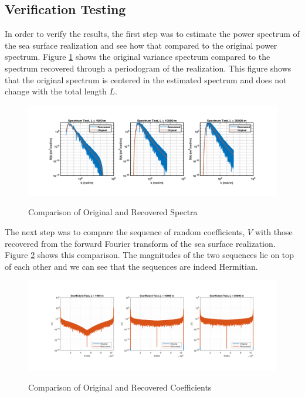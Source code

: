 \subsection{Verification Testing}
In order to verify the results, the first step was to estimate the power spectrum of the sea surface realization and see how that compared to the original power spectrum. Figure \ref{os_fig:9} shows the original variance spectrum compared to the spectrum recovered through a periodogram of the realization. This figure shows that the original spectrum is centered in the estimated spectrum and does not change with the total length $L$.
\begin{figure}[H]
  \begin{center}
\includegraphics[width=6in]{../media/Ocean_Surface/power_spectrum_test.png}
  \end{center}
  \renewcommand{\baselinestretch}{1} \small\normalsize
  \begin{quote}
    \caption[Comparison of Original and Recovered Spectra]{Comparison of Original and Recovered Spectra\label{os_fig:9}}
  \end{quote}
\end{figure}
\renewcommand{\baselinestretch}{2} \small\normalsize

The next step was to compare the sequence of random coefficients, $V$ with those recovered from the forward Fourier transform of the sea surface realization. Figure \ref{os_fig:10} shows this comparison. The magnitudes of the two sequences lie on top of each other and we can see that the sequences are indeed Hermitian.
\begin{figure}[H]
  \begin{center}
\includegraphics[width=6in]{../media/Ocean_Surface/random_variable_test.png}
  \end{center}
  \renewcommand{\baselinestretch}{1} \small\normalsize
  \begin{quote}
    \caption[Comparison of Original and Recovered Coefficients]{Comparison of Original and Recovered Coefficients\label{os_fig:10}}
  \end{quote}
\end{figure}
\renewcommand{\baselinestretch}{2} \small\normalsize

